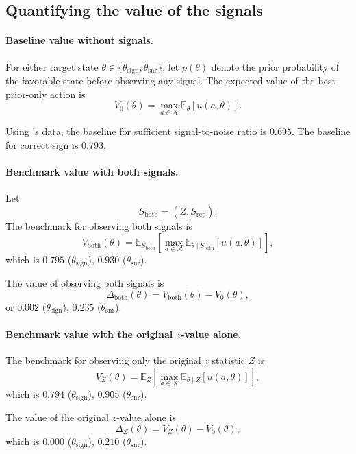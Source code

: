 \subsection{Quantifying the value of the signals}
\paragraph{Baseline value without signals.}
For either target state \(\theta \in \{\theta_{\mathrm{sign}},\theta_{\mathrm{snr}}\}\), let \(p(\theta)\) denote the prior probability of the favorable state before observing any signal. The expected value of the best prior-only action is
\[
V_0(\theta)
=
\max_{a\in\mathcal{A}}
\mathbb{E}_{\theta}[u(a,\theta)].
\]

Using \citet{vanzwet2026}'s data, the baseline for sufficient signal-to-noise ratio is $0.695$. The baseline for correct sign is $0.793$.



\paragraph{Benchmark value with both signals.}
Let
\[
S_{\mathrm{both}}=(Z,S_{\mathrm{rep}}).
\]
The benchmark for observing both signals is
\[
V_{\mathrm{both}}(\theta)
=
\mathbb{E}_{S_{\mathrm{both}}}
\left[
\max_{a\in\mathcal{A}}
\mathbb{E}_{\theta\mid S_{\mathrm{both}}}[u(a,\theta)]
\right],
\]
which is $0.795$ ($\theta_{\mathrm{sign}}$), $0.930$ ($\theta_{\mathrm{snr}}$).

The value of observing both signals is
\[
\Delta_{\mathrm{both}}(\theta)
=
V_{\mathrm{both}}(\theta)-V_0(\theta),
\]
or $0.002$ ($\theta_{\mathrm{sign}}$), $0.235$ ($\theta_{\mathrm{snr}}$).

\paragraph{Benchmark value with the original $z$-value alone.}
The benchmark for observing only the original $z$ statistic \(Z\) is
\[
V_Z(\theta)
=
\mathbb{E}_{Z}
\left[
\max_{a\in\mathcal{A}}
\mathbb{E}_{\theta\mid Z}[u(a,\theta)]
\right],
\]
which is $0.794$ ($\theta_{\mathrm{sign}}$), $0.905$ ($\theta_{\mathrm{snr}}$).

The value of the original $z$-value alone is
\[
\Delta_Z(\theta)
=
V_Z(\theta)-V_0(\theta),
\]
which is $0.000$ ($\theta_{\mathrm{sign}}$), $0.210$ ($\theta_{\mathrm{snr}}$).



